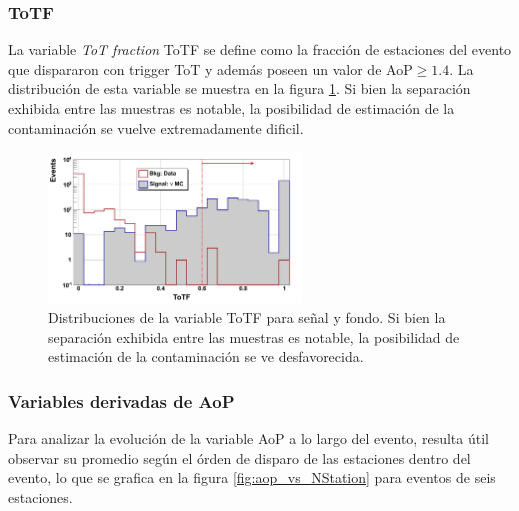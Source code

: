 	\subsubsection{ToTF}
	La variable \emph{ToT fraction} ToTF se define como la fracción de estaciones del evento que dispararon con trigger ToT y además poseen un valor de AoP$\geq1.4$.
	La distribución de esta variable se muestra en la figura \ref{fig:totfDist}.
	Si bien la separación exhibida entre las muestras es notable, la posibilidad de estimación de la contaminación se vuelve extremadamente dificil.
	
	\begin{figure}[ht!]
		\begin{center}
		\includegraphics[width=0.6\textwidth]{fig/seleccionAuger/ToTF_forThesis}
		\caption{Distribuciones de la variable ToTF para señal y fondo. Si bien la separación exhibida entre las muestras es notable, la posibilidad de estimación de la contaminación se ve desfavorecida.}
		\label{fig:totfDist}
		\end{center}
	\end{figure}
	
	
	\subsubsection{Variables derivadas de AoP}
	
	Para analizar la evolución de la variable AoP a lo largo del evento, resulta útil observar su promedio según el órden de disparo de las estaciones dentro del evento, lo que se grafica en la figura \ref{fig:aop_vs_NStation} para eventos de seis estaciones.
	
